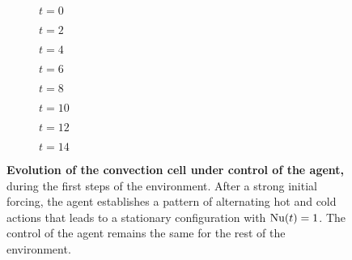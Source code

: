 \begin{figure}
\centering

\begin{subfigure}[t]{.22\textwidth}
	\centering
    	\caption{$t=0$}
	\label{fig:rayleigh_field_0}
\end{subfigure} \quad
\begin{subfigure}[t]{.22\textwidth}
	\centering
    	\caption{$t=2$}
	\label{fig:rayleigh_field_2}
\end{subfigure} \quad
\begin{subfigure}[t]{.22\textwidth}
	\centering
    	\caption{$t=4$}
	\label{fig:rayleigh_field_4}
\end{subfigure} \quad
\begin{subfigure}[t]{.22\textwidth}
	\centering
    	\caption{$t=6$}
	\label{fig:rayleigh_field_6}
\end{subfigure}

\medskip

\begin{subfigure}[t]{.22\textwidth}
	\centering
    	\caption{$t=8$}
	\label{fig:rayleigh_field_8}
\end{subfigure} \quad
\begin{subfigure}[t]{.22\textwidth}
	\centering
    	\caption{$t=10$}
	\label{fig:rayleigh_field_10}
\end{subfigure} \quad
\begin{subfigure}[t]{.22\textwidth}
	\centering
    	\caption{$t=12$}
	\label{fig:rayleigh_field_12}
\end{subfigure} \quad
\begin{subfigure}[t]{.22\textwidth}
	\centering
    	\caption{$t=14$}
	\label{fig:rayleigh_field_14}
\end{subfigure}

\caption{\textbf{Evolution of the convection cell under control of the agent,} during the first steps of the environment. After a strong initial forcing, the agent establishes a pattern of alternating hot and cold actions that leads to a stationary configuration with $\text{Nu}(t) = 1$. The control of the agent remains the same for the rest of the environment.}
\label{fig:rayleigh_fields}
\end{figure} 
